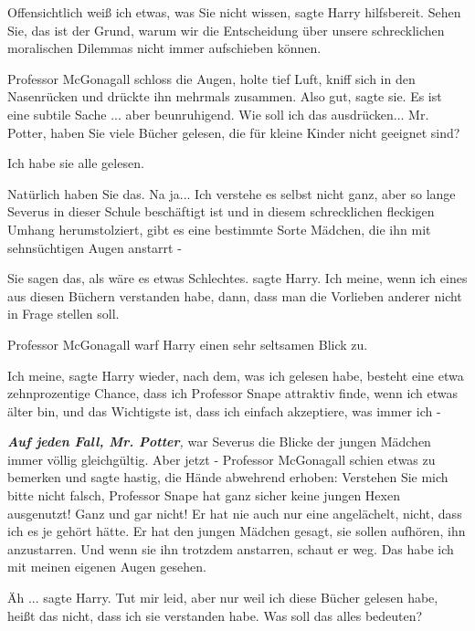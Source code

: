 \glqq Offensichtlich weiß ich etwas, was Sie nicht wissen\grqq{}, sagte Harry
hilfsbereit. \glqq Sehen Sie, das ist der Grund, warum wir die Entscheidung über
unsere schrecklichen moralischen Dilemmas nicht immer aufschieben können.\grqq{}

Professor McGonagall schloss die Augen, holte tief Luft, kniff sich in den
Nasenrücken und drückte ihn mehrmals zusammen. \glqq Also gut\grqq{}, sagte sie.
\glqq Es ist eine subtile Sache ... aber beunruhigend. Wie soll ich das
ausdrücken... Mr. Potter, haben Sie viele Bücher gelesen, die für kleine Kinder
nicht geeignet sind?\grqq{}

\glqq Ich habe sie alle gelesen.\grqq{}

\glqq Natürlich haben Sie das. Na ja... Ich verstehe es selbst nicht ganz, aber
so lange Severus in dieser Schule beschäftigt ist und in diesem schrecklichen
fleckigen Umhang herumstolziert, gibt es eine bestimmte Sorte Mädchen, die ihn
mit sehnsüchtigen Augen anstarrt -\grqq{}

\glqq Sie sagen das, als wäre es etwas Schlechtes.\grqq{} sagte Harry. \glqq Ich
meine, wenn ich eines aus diesen Büchern verstanden habe, dann, dass man die
Vorlieben anderer nicht in Frage stellen soll.\grqq{}

Professor McGonagall warf Harry einen sehr seltsamen Blick zu.

\glqq Ich meine\grqq{}, sagte Harry wieder, \glqq nach dem, was ich gelesen
habe, besteht eine etwa zehnprozentige Chance, dass ich Professor Snape
attraktiv finde, wenn ich etwas älter bin, und das Wichtigste ist, dass ich
einfach akzeptiere, was immer ich -\grqq{}

\glqq \textbf{\emph{Auf jeden Fall, Mr. Potter}}\emph{,} war Severus die Blicke
der jungen Mädchen immer völlig gleichgültig. Aber jetzt -\grqq{} Professor
McGonagall schien etwas zu bemerken und sagte hastig, die Hände abwehrend
erhoben: \glqq Verstehen Sie mich bitte nicht falsch, Professor Snape hat ganz
sicher keine jungen Hexen ausgenutzt! Ganz und gar nicht! Er hat nie auch nur
eine angelächelt, nicht, dass ich es je gehört hätte. Er hat den jungen Mädchen
gesagt, sie sollen aufhören, ihn anzustarren. Und wenn sie ihn trotzdem
anstarren, schaut er weg. Das habe ich mit meinen eigenen Augen gesehen.\grqq{}

\glqq Äh ...\grqq{} sagte Harry. \glqq Tut mir leid, aber nur weil ich diese
Bücher gelesen habe, heißt das nicht, dass ich sie verstanden habe. Was soll das
alles bedeuten?\grqq{}

